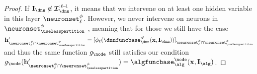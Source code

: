 \begin{proof}
    If $\interventionsdnn \not\in \interventionsset^{:\layer\!-\!1}_{\dnn}$, it means that we intervene on at least one hidden variable in this layer $\neuronset^{\causalmap}_{\layer}$.
    However, we never intervene on neurons in $\neuronset^{\causalmap}_{\uselesspartition}$
    , meaning that for those we still have the case $\hiddenstates'_{\neuronset^{\causalmap}_{\layer} \cap \neuronset^{\causalmap}_{\uselesspartition}} = [\causalmap_{\layer}(\dnnfunclayer{:\layer}(\bx, \interventionsdnn))]_{\neuronset^{\causalmap}_{\layer} \cap \neuronset^{\causalmap}_{\uselesspartition}}$ and thus the same function $g_{\node}$ still satisfies our condition
    $g_{\node}(\hiddenstates'_{\neuronset^{\causalmap}_{\layer} \cap \neuronset^{\causalmap}_{\uselesspartition}}) = \algfuncnode{\node}(\bx, \interventions_{\alg})$.
\end{proof}

